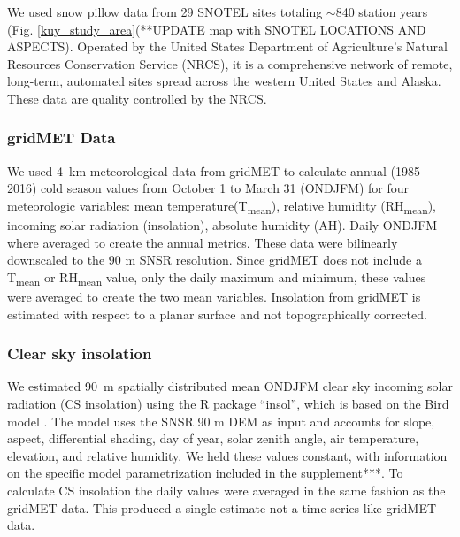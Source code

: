 We used snow pillow data from 29 SNOTEL sites totaling $\sim$840 station years (Fig. \ref{kuy_study_area}(**UPDATE map with SNOTEL LOCATIONS AND ASPECTS). Operated by the United States Department of Agriculture's Natural Resources Conservation Service (NRCS), it is a comprehensive network of remote, long-term, automated sites spread across the western United States and Alaska. These data are quality controlled by the NRCS.

\hypertarget{ch2-do-2}{\subsubsection{gridMET Data}\label{ch2-do-2}}

We used 4~km meteorological data from gridMET \citep{abatzoglouDevelopmentGriddedSurface2013} to calculate annual (1985--2016) cold season values from October 1 to March 31 (ONDJFM) for four meteorologic variables: mean temperature(T\textsubscript{mean}), relative humidity (RH\textsubscript{mean}), incoming solar radiation (insolation), absolute humidity (AH). Daily ONDJFM where averaged to create the annual metrics. These data were bilinearly downscaled to the 90 m SNSR resolution. Since gridMET does not include a T\textsubscript{mean} or RH\textsubscript{mean} value, only the daily maximum and minimum, these values were averaged to create the two mean variables. Insolation from gridMET is estimated with respect to a planar surface and not topographically corrected. 

\hypertarget{ch2-do-2}{\subsubsection{Clear sky insolation}\label{ch2-do-2}}


We estimated 90~m spatially distributed mean ONDJFM clear sky incoming solar radiation (CS insolation) using the R package “insol”, which is based on the Bird model \citep{birdReviewEvaluationImprovement1981}. The model uses the SNSR 90 m DEM as input and accounts for slope, aspect, differential shading, day of year, solar zenith angle, air temperature, elevation, and relative humidity. We held these values constant, with information on the specific model parametrization included in the supplement***. To calculate CS insolation the daily values were averaged in the same fashion as the gridMET data. This produced a single estimate not a time series like gridMET data.


